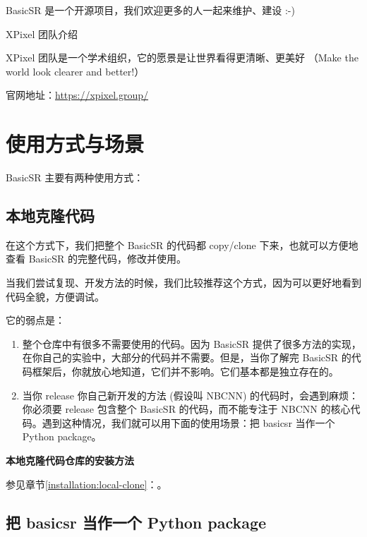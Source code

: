 \documentclass[../main.tex]{subfiles}
\begin{document}
BasicSR 是一个开源项目，我们欢迎更多的人一起来维护、建设 :-)

\begin{exampleBox}[]{XPixel 团队介绍}

    XPixel 团队是一个学术组织，它的愿景是让世界看得更清晰、更美好 （Make the world look clearer and better!）

    官网地址：\url{https://xpixel.group/}
\end{exampleBox}

\section{使用方式与场景}
\label{overview:scenario}
BasicSR 主要有两种使用方式：

\subsection{本地克隆代码}

在这个方式下，我们把整个 BasicSR 的代码都 copy/clone 下来，也就可以方便地查看 BasicSR 的完整代码，修改并使用。

当我们尝试复现、开发方法的时候，我们比较推荐这个方式，因为可以更好地看到代码全貌，方便调试。

它的弱点是：

\begin{enumerate}
    \item 整个仓库中有很多不需要使用的代码。因为 BasicSR 提供了很多方法的实现，在你自己的实验中，大部分的代码并不需要。但是，当你了解完 BasicSR 的代码框架后，你就放心地知道，它们并不影响。它们基本都是独立存在的。
    \item 当你 release 你自己新开发的方法 (假设叫 NBCNN) 的代码时，会遇到麻烦：你必须要 release 包含整个 BasicSR 的代码，而不能专注于 NBCNN 的核心代码。遇到这种情况，我们就可以用下面的使用场景：把 basicsr 当作一个 Python package。
\end{enumerate}

\begin{note} %
    \textbf{本地克隆代码仓库的安装方法}

    参见章节\ref{installation:local-clone}：。
\end{note}

\subsection{把 basicsr 当作一个 Python package}
\end{document}
